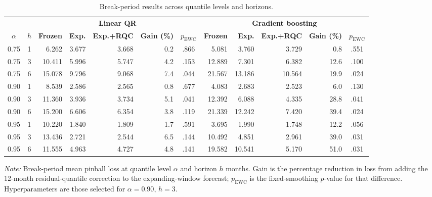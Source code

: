 \begin{table}[t]
\caption{Break-period results across quantile levels and horizons.\label{tab:robust}}
\centering\footnotesize\setlength{\tabcolsep}{3pt}
\begin{tabular*}{\textwidth}{@{\extracolsep\fill}ccrrrrcrrrrc@{}}
\toprule
 & & \multicolumn{5}{c}{\textbf{Linear QR}} & \multicolumn{5}{c}{\textbf{Gradient boosting}} \\
\cmidrule(lr){3-7}\cmidrule(l){8-12}
$\alpha$ & $h$ & \textbf{Frozen} & \textbf{Exp.} & \textbf{Exp.+RQC} & \textbf{Gain (\%)} & $p_{\mathrm{EWC}}$ & \textbf{Frozen} & \textbf{Exp.} & \textbf{Exp.+RQC} & \textbf{Gain (\%)} & $p_{\mathrm{EWC}}$ \\
\midrule
0.75 & 1 & 6.262 & 3.677 & 3.668 & 0.2 & .866 & 5.081 & 3.760 & 3.729 & 0.8 & .551 \\
0.75 & 3 & 10.411 & 5.996 & 5.747 & 4.2 & .153 & 12.889 & 7.301 & 6.382 & 12.6 & .100 \\
0.75 & 6 & 15.078 & 9.796 & 9.068 & 7.4 & .044 & 21.567 & 13.186 & 10.564 & 19.9 & .024 \\
0.90 & 1 & 8.539 & 2.586 & 2.565 & 0.8 & .677 & 4.083 & 2.683 & 2.523 & 6.0 & .130 \\
0.90 & 3 & 11.360 & 3.936 & 3.734 & 5.1 & .041 & 12.392 & 6.088 & 4.335 & 28.8 & .041 \\
0.90 & 6 & 15.200 & 6.606 & 6.354 & 3.8 & .119 & 21.339 & 12.242 & 7.420 & 39.4 & .024 \\
0.95 & 1 & 10.220 & 1.840 & 1.809 & 1.7 & .591 & 3.695 & 1.990 & 1.748 & 12.2 & .056 \\
0.95 & 3 & 13.436 & 2.721 & 2.544 & 6.5 & .144 & 10.492 & 4.851 & 2.961 & 39.0 & .031 \\
0.95 & 6 & 11.555 & 4.963 & 4.727 & 4.8 & .141 & 19.582 & 10.541 & 5.170 & 51.0 & .031 \\
\bottomrule
\end{tabular*}
\begin{tablenotes}
\item \textit{Note:} Break-period mean pinball loss at quantile level $\alpha$ and horizon $h$ months. Gain is the percentage reduction in loss from adding the 12-month residual-quantile correction to the expanding-window forecast; $p_{\mathrm{EWC}}$ is the fixed-smoothing $p$-value for that difference. Hyperparameters are those selected for $\alpha=0.90$, $h=3$.
\end{tablenotes}
\end{table}
